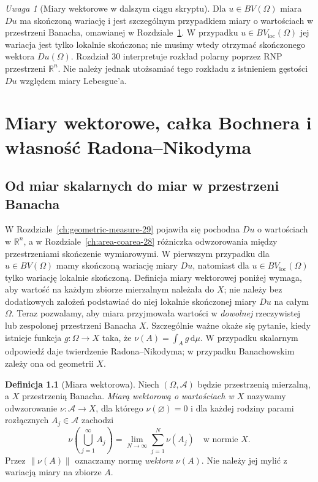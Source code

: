 \documentclass[11pt,a4paper,oneside]{book}
\numberwithin{equation}{chapter}
\theoremstyle{plain}
\theoremstyle{definition}
\newtheorem{definicja}[twierdzenie]{Definicja}
\theoremstyle{remark}
\newtheorem{uwaga}[twierdzenie]{Uwaga}
\begin{document}
\begin{uwaga}[Miary wektorowe w dalszym ciągu skryptu]
Dla $u\in BV(\Omega)$ miara $Du$ ma skończoną wariację
i jest szczególnym przypadkiem miary o wartościach
w przestrzeni Banacha, omawianej w
Rozdziale~\ref{ch:vector-measures-30}.
W przypadku $u\in BV_{\mathrm{loc}}(\Omega)$ jej wariacja
jest tylko lokalnie skończona; nie musimy wtedy otrzymać
skończonego wektora $Du(\Omega)$.
Rozdział 30 interpretuje rozkład polarny poprzez RNP
przestrzeni $\mathbb R^n$. Nie należy jednak utożsamiać
tego rozkładu z istnieniem gęstości $Du$ względem
miary Lebesgue'a.
\end{uwaga}



\chapter[Miary wektorowe i własność Radona--Nikodyma]{Miary wektorowe, całka Bochnera i własność Radona--Nikodyma}
\label{ch:vector-measures-30}

\section{Od miar skalarnych do miar w przestrzeni Banacha}
\label{sec:vector-intro-30}
W Rozdziale~\ref{ch:geometric-measure-29} pojawiła się
pochodna $Du$ o wartościach w $\mathbb R^n$,
a w Rozdziale~\ref{ch:area-coarea-28} różniczka
odwzorowania między przestrzeniami skończenie wymiarowymi.
W pierwszym przypadku dla $u\in BV(\Omega)$ mamy
skończoną wariację miary $Du$, natomiast dla
$u\in BV_{\mathrm{loc}}(\Omega)$ tylko wariację
lokalnie skończoną. Definicja miary wektorowej
poniżej wymaga, aby wartość na każdym zbiorze
mierzalnym należała do $X$; nie należy bez dodatkowych
założeń podstawiać do niej lokalnie skończonej
miary $Du$ na całym $\Omega$. Teraz pozwalamy, aby miara przyjmowała
wartości w \emph{dowolnej} rzeczywistej lub zespolonej przestrzeni
Banacha $X$. Szczególnie ważne okaże się pytanie, kiedy istnieje
funkcja $g:\Omega\to X$ taka, że $\nu(A)=\int_Ag\,\mathrm d\mu$.
W przypadku skalarnym odpowiedź daje twierdzenie Radona--Nikodyma;
w przypadku Banachowskim zależy ona od geometrii $X$.

\begin{definicja}[Miara wektorowa]
\label{def:vector-measure-30}
Niech $(\Omega,\mathcal A)$ będzie przestrzenią mierzalną,
a $X$ przestrzenią Banacha. \emph{Miarą wektorową o wartościach w $X$}
nazywamy odwzorowanie $\nu:\mathcal A\to X$, dla którego
$\nu(\varnothing)=0$ i dla każdej rodziny parami rozłącznych
$A_j\in\mathcal A$ zachodzi
\[
 \nu\left(\bigcup_{j=1}^{\infty}A_j\right)
 =\lim_{N\to\infty}\sum_{j=1}^{N}\nu(A_j)
 \quad\text{w normie }X.
\]
Przez $\|\nu(A)\|$ oznaczamy normę \emph{wektora} $\nu(A)$.
Nie należy jej mylić z wariacją miary na zbiorze $A$.
\end{definicja}
\end{document}
